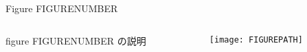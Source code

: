 \begin{frame}{Figure FIGURENUMBER}
    \begin{columns}
        \begin{column}{0.4\textwidth}
            figure FIGURENUMBER の説明
        \end{column}
        \begin{column}{0.6\textwidth}
            \begin{figure}
                \centering
                \texttt{[image: FIGUREPATH]}
                \caption{}
            \end{figure}
        \end{column}
    \end{columns}
\end{frame}

